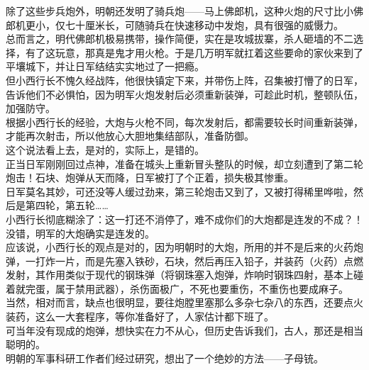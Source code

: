 \begin{multicols}{\theparacolNo}
除了这些步兵炮外，明朝还发明了骑兵炮——马上佛郎机，这种火炮的尺寸比小佛郎机更小，仅七十厘米长，可随骑兵在快速移动中发炮，具有很强的威慑力。\\

总而言之，明代佛郎机极易携带，操作简便，实在是攻城拔寨，杀人砸墙的不二选择，有了这玩意，那真是鬼才用火枪。于是几万明军就扛着这些要命的家伙来到了平壤城下，并让日军结结实实地过了一把瘾。\\

但小西行长不愧久经战阵，他很快镇定下来，并带伤上阵，召集被打懵了的日军，告诉他们不必惧怕，因为明军火炮发射后必须重新装弹，可趁此时机，整顿队伍，加强防守。\\

根据小西行长的经验，大炮与火枪不同，每次发射后，都需要较长时间重新装弹，才能再次射击，所以他放心大胆地集结部队，准备防御。\\

这个说法看上去，是对的，实际上，是错的。\\

正当日军刚刚回过点神，准备在城头上重新冒头整队的时候，却立刻遭到了第二轮炮击！石块、炮弹从天而降，日军被打了个正着，损失极其惨重。\\

日军莫名其妙，可还没等人缓过劲来，第三轮炮击又到了，又被打得稀里哗啦，然后是第四轮，第五轮……\\

小西行长彻底糊涂了：这一打还不消停了，难不成你们的大炮都是连发的不成？！\\

没错，明军的大炮确实是连发的。\\

应该说，小西行长的观点是对的，因为明朝时的大炮，所用的并不是后来的火药炮弹，一打炸一片，而是先塞入铁砂，石块，然后再压入铅子，并装药（火药）点燃发射，其作用类似于现代的钢珠弹（将钢珠塞入炮弹，炸响时钢珠四射，基本上碰着就完蛋，属于禁用武器），杀伤面极广，不死也要重伤，不重伤也要成麻子。\\

当然，相对而言，缺点也很明显，要往炮膛里塞那么多杂七杂八的东西，还要点火装药，这么一大套程序，等你准备好了，人家估计都下班了。\\

可当年没有现成的炮弹，想快实在力不从心，但历史告诉我们，古人，那还是相当聪明的。\\

明朝的军事科研工作者们经过研究，想出了一个绝妙的方法——子母铳。\\


\end{multicols}
